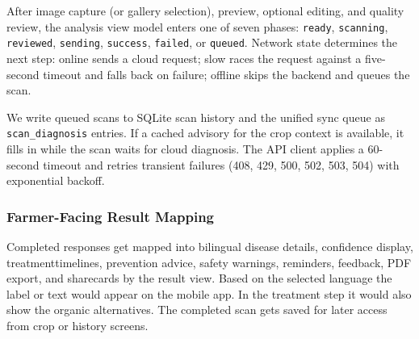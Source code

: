 After image capture (or gallery selection), preview, optional editing, and quality review, the
analysis view model enters one of seven phases: \texttt{ready}, \texttt{scanning},
\texttt{reviewed}, \texttt{sending}, \texttt{success}, \texttt{failed}, or \texttt{queued}.
Network state determines the next step: online sends a cloud request; slow races the request
against a five-second timeout and falls back on failure; offline skips the backend and queues
the scan.

We write queued scans to SQLite scan history and the unified sync queue as
\texttt{scan\_diagnosis} entries. If a cached advisory for the crop context is available, it
fills in while the scan waits for cloud diagnosis. The API client applies a 60-second timeout
and retries transient failures (408, 429, 500, 502, 503, 504) with exponential backoff.
\subsubsection{Farmer-Facing Result Mapping}Completed responses get mapped into bilingual disease details, confidence display, treatmenttimelines, prevention advice, safety warnings, reminders, feedback, PDF export, and sharecards by the result view. Based on the selected language the label or text would appear on the mobile app. In the treatment step it would also show the organic alternatives. The completed scan gets saved for later access from crop or history screens.